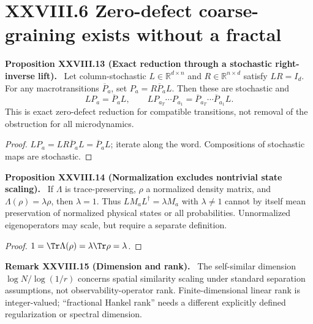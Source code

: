 \documentclass[11pt,a4paper,oneside]{book}
\newcommand{\R}{\mathbb R}\newcommand{\C}{\mathbb C}\newcommand{\Z}{\mathbb Z}\newcommand{\N}{\mathbb N}\newcommand{\Q}{\mathbb Q}
\newcommand{\statement}[3]{\par\medskip\noindent\textbf{#1 #2 (#3).}\ }
\begin{document}
\section*{XXVIII.6 Zero-defect coarse-graining exists without a fractal}
\statement{Proposition}{XXVIII.13}{Exact reduction through a stochastic right-inverse lift} Let column-stochastic $L\in\R^{d\times n}$ and $R\in\R^{n\times d}$ satisfy $LR=I_d$. For any macrotransitions $\overline P_a$, set $P_a=R\overline P_aL$. Then these are stochastic and
\[LP_a=\overline P_aL,\qquad LP_{a_T}\cdots P_{a_1}=\overline P_{a_T}\cdots\overline P_{a_1}L.\]
This is exact zero-defect reduction for compatible transitions, not removal of the obstruction for all microdynamics.
\begin{proof}$LP_a=LR\overline P_aL=\overline P_aL$; iterate along the word. Compositions of stochastic maps are stochastic.\end{proof}
\statement{Proposition}{XXVIII.14}{Normalization excludes nontrivial state scaling} If $\Lambda$ is trace-preserving, $\rho$ a normalized density matrix, and $\Lambda(\rho)=\lambda\rho$, then $\lambda=1$. Thus $LM_aL^\dagger=\lambda M_a$ with $\lambda\ne1$ cannot by itself mean preservation of normalized physical states or all probabilities. Unnormalized eigenoperators may scale, but require a separate definition.
\begin{proof}$1=\Tr\Lambda(\rho)=\lambda\Tr\rho=\lambda$.\end{proof}
\statement{Remark}{XXVIII.15}{Dimension and rank} The self-similar dimension $\log N/\log(1/r)$ concerns spatial similarity scaling under standard separation assumptions, not observability-operator rank. Finite-dimensional linear rank is integer-valued; ``fractional Hankel rank'' needs a different explicitly defined regularization or spectral dimension.
\end{document}
